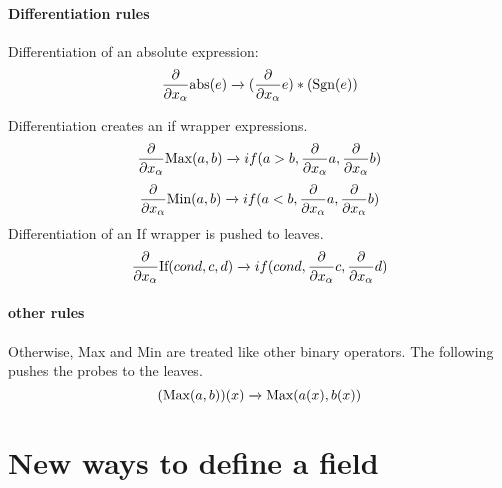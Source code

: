 \documentclass{article}
\begin{document}
 \paragraph{Differentiation rules}
 Differentiation of an absolute expression:
  $$\frac{\partial}{\partial x_\alpha} \text{abs}(e) \xrightarrow[]{}
( \frac{\partial}{\partial x_\alpha} e) *(\text{Sgn} (e))
 $$ 

Differentiation creates an if wrapper expressions.
 $$\frac{\partial}{\partial x_\alpha} \text{Max}(a,b) \xrightarrow[]{} if(a>b, \frac{\partial}{\partial x_\alpha}a, \frac{\partial}{\partial x_\alpha}b)  $$
 $$\frac{\partial}{\partial x_\alpha}\text{Min}(a,b) \xrightarrow[]{} if(a<b, \frac{\partial}{\partial x_\alpha}  a, \frac{\partial}{\partial x_\alpha} b)  $$
  Differentiation of an If wrapper is pushed to leaves.
   $$\frac{\partial}{\partial x_\alpha} \text{If}(cond, c,d) \xrightarrow[]{} if(cond, \frac{\partial}{\partial x_\alpha}c, \frac{\partial}{\partial x_\alpha}d)  $$
  \paragraph{other  rules}
Otherwise, Max and Min are treated like  other binary operators. The following pushes the probes to the leaves.
  $$ (\text{Max}(a,b))(x) \xrightarrow[]{} \text{Max}(a(x),  b(x)) $$

   
   
\section{New ways to define a field}
\end{document}
